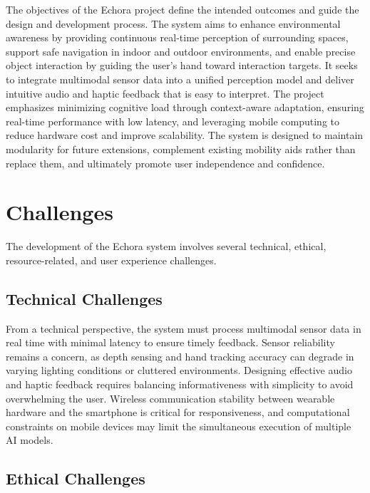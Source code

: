 The objectives of the Echora project define the intended outcomes and guide the design and development process. The system aims to enhance environmental awareness by providing continuous real-time perception of surrounding spaces, support safe navigation in indoor and outdoor environments, and enable precise object interaction by guiding the user’s hand toward interaction targets. It seeks to integrate multimodal sensor data into a unified perception model and deliver intuitive audio and haptic feedback that is easy to interpret. The project emphasizes minimizing cognitive load through context-aware adaptation, ensuring real-time performance with low latency, and leveraging mobile computing to reduce hardware cost and improve scalability. The system is designed to maintain modularity for future extensions, complement existing mobility aids rather than replace them, and ultimately promote user independence and confidence.

\section{Challenges}
\label{subsec:challenges}

The development of the Echora system involves several technical, ethical, resource-related, and user experience challenges.

\subsection{Technical Challenges}
\label{subsubsec:technical_challenges}

From a technical perspective, the system must process multimodal sensor data in real time with minimal latency to ensure timely feedback. Sensor reliability remains a concern, as depth sensing and hand tracking accuracy can degrade in varying lighting conditions or cluttered environments. Designing effective audio and haptic feedback requires balancing informativeness with simplicity to avoid overwhelming the user. Wireless communication stability between wearable hardware and the smartphone is critical for responsiveness, and computational constraints on mobile devices may limit the simultaneous execution of multiple AI models.

\subsection{Ethical Challenges}
\label{subsubsec:ethical_challenges}

